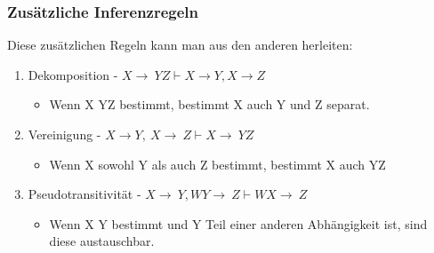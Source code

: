 \documentclass{article}
\begin{document}
	\subsubsection{Zusätzliche Inferenzregeln}
	Diese zusätzlichen Regeln kann man aus den anderen herleiten:
	\begin{enumerate}
		\item{Dekomposition - $X\to\ YZ \vdash X\to Y, X\to Z$}
		\begin{itemize}
			\item{Wenn X YZ bestimmt, bestimmt X auch Y und Z separat.}
		\end{itemize}
		\item{Vereinigung - $X\to Y,\ X\to\ Z \vdash X \to\ YZ$}
		\begin{itemize}
			\item{Wenn X sowohl Y als auch Z bestimmt, bestimmt X auch YZ}
		\end{itemize}
		\item{Pseudotransitivität - $X\to\ Y, WY\to\ Z \vdash WX\to\ Z$}
		\begin{itemize}
			\item{Wenn X Y bestimmt und Y Teil einer anderen Abhängigkeit ist, sind diese austauschbar.}
		\end{itemize}
	\end{enumerate}
\end{document}

